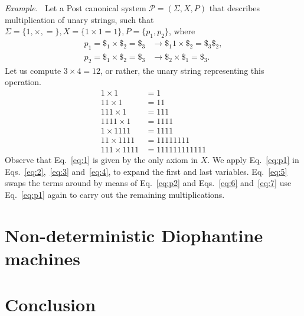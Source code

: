 \documentclass[12pt]{article}
\begin{document}
\emph{Example.~\cite[Problem 12-4.3]{}} Let a Post canonical system $\mathcal{P} = (\Sigma, X, P)$ that describes multiplication of unary strings, such that $\Sigma = \{1, \times, =\}, X = \{1 \times 1 = 1\}, P = \{p_{1}, p_{2}\}$, where 
\begin{align}
    p_{1} = \$_{1} \times \$_{2} = \$_{3} &\rightarrow \$_{1}1 \times \$_{2} = \$_{3}\$_{2}, \label{eq:p1} \\
    p_{2} = \$_{1} \times \$_{2} = \$_{3} &\rightarrow \$_{2} \times \$_{1} = \$_{3}. \label{eq:p2}
\end{align}
Let us compute $3 \times 4 = 12$, or rather, the unary string representing this operation.
\begin{align}
    1    \times 1    &= 1            \label{eq:1} \\
    11   \times 1    &= 11           \label{eq:2} \\
    111  \times 1    &= 111          \label{eq:3} \\
    1111 \times 1    &= 1111         \label{eq:4} \\
    1    \times 1111 &= 1111         \label{eq:5} \\
    11   \times 1111 &= 11111111     \label{eq:6} \\
    111  \times 1111 &= 111111111111 \label{eq:7}
\end{align}
Observe that Eq.~\ref{eq:1} is given by the only axiom in $X$. We apply Eq.~\ref{eq:p1} in Eqs.~\ref{eq:2},~\ref{eq:3} and~\ref{eq:4}, to expand the first and last variables. Eq.~\ref{eq:5} swaps the terms around by means of Eq.~\ref{eq:p2} and Eqs.~\ref{eq:6} and~\ref{eq:7} use Eq.~\ref{eq:p1} again to carry out the remaining multiplications.


    

\section{Non-deterministic Diophantine machines}\label{sec:nddm}

\section{Conclusion}\label{sec:conc}



\end{document}

